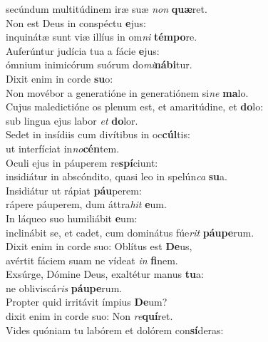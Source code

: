\oddverse secúndum multitúdinem iræ suæ \textit{non} \textbf{quæ}ret.\\
\evenverse Non est Deus in conspéctu \textbf{e}jus:~\*\\
\evenverse inquinátæ sunt viæ illíus in om\textit{ni} \textbf{tém}\textbf{po}re.\\
\oddverse Auferúntur judícia tua a fácie \textbf{e}jus:~\*\\
\oddverse ómnium inimicórum suórum do\textit{mi}\textbf{ná}\textbf{bi}tur.\\
\evenverse Dixit enim in corde \textbf{su}o:~\*\\
\evenverse Non movébor a generatióne in generatiónem si\textit{ne} \textbf{ma}lo.\\
\oddverse Cujus maledictióne os plenum est, et amaritúdine, et \textbf{do}lo:~\*\\
\oddverse sub lingua ejus labor \textit{et} \textbf{do}lor.\\
\evenverse Sedet in insídiis cum divítibus in oc\textbf{cúl}tis:~\*\\
\evenverse ut interfíciat in\textit{no}\textbf{cén}tem.\\
\oddverse Oculi ejus in páuperem re\textbf{spí}ciunt:~\*\\
\oddverse insidiátur in abscóndito, quasi leo in spelún\textit{ca} \textbf{su}a.\\
\evenverse Insidiátur ut rápiat \textbf{páu}perem:~\*\\
\evenverse rápere páuperem, dum áttra\textit{hit} \textbf{e}um.\\
\oddverse In láqueo suo humiliábit \textbf{e}um:~\*\\
\oddverse inclinábit se, et cadet, cum dominátus fúe\textit{rit} \textbf{páu}\textbf{pe}rum.\\
\evenverse Dixit enim in corde suo: Oblítus est \textbf{De}us,~\*\\
\evenverse avértit fáciem suam ne vídeat \textit{in} \textbf{fi}nem.\\
\oddverse Exsúrge, Dómine Deus, exaltétur manus \textbf{tu}a:~\*\\
\oddverse ne obliviscá\textit{ris} \textbf{páu}\textbf{pe}rum.\\
\evenverse Propter quid irritávit ímpius \textbf{De}um?~\*\\
\evenverse dixit enim in corde suo: Non \textit{re}\textbf{quí}ret.\\
\oddverse Vides quóniam tu labórem et dolórem con\textbf{sí}deras:~\*\\
